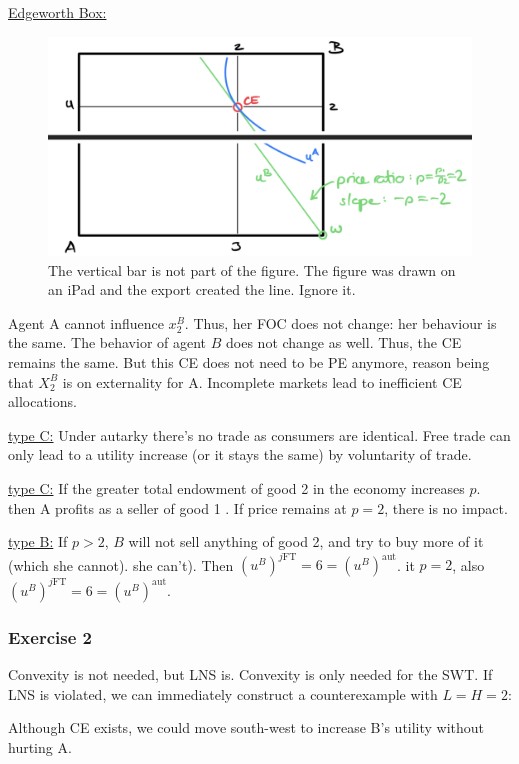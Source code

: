 {\begin{enumerate}[label=(\alph*)]
{\underline{Edgeworth Box:}

\begin{figure}[htp!]
    \centering
    \includegraphics[width=0.75\linewidth]{images/2012_13_edgeworth_box.png}
    \caption{The vertical bar is not part of the figure. The figure was drawn on an iPad and the export created the line. Ignore it.}
\end{figure}
}
{\item 
Agent A cannot influence $x_2^B$. Thus, her FOC does not change: her behaviour is the same. The behavior of agent $B$ does not change as well. Thus, the CE remains the same.
But this CE does not need to be PE anymore, reason being that $X_2^B$ is on externality for A. Incomplete markets lead to inefficient CE allocations.
}
{\item 
\underline{type C:}
Under autarky there's no trade as consumers are identical. Free trade can only lead to a utility increase (or it stays the same) by voluntarity of trade.

\underline{type C:}
If the greater total endowment of good 2 in the economy increases $p$. then A profits as a seller of good 1 .
If price remains at $p=2$, there is no impact.

\underline{type B:}
If $p>2$, $B$ will not sell anything of good 2, and try to buy more of it (which she cannot).
she can't). Then $\left(u^B\right)^{j\text{FT}}=6=\left(u^B\right)^{\text{aut}}$. it $p=2$, also $\left(u^B\right)^{j\text{FT}}=6=\left(u^B\right)^{\text{aut}}$.
}

\subsubsection*{Exercise 2}

Convexity is not needed, but LNS is. Convexity is only needed for the SWT. If LNS is violated, we can immediately construct a counterexample with $L=H=2$:

Although CE exists, we could move south-west to increase B's utility without hurting A.


\end{enumerate}}
